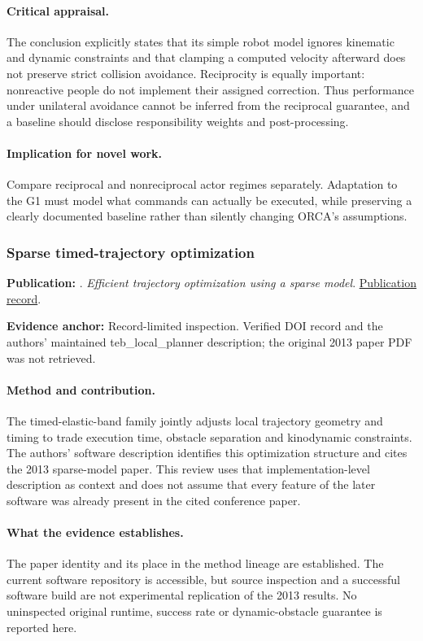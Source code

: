 \paragraph{Critical appraisal.} The conclusion explicitly states that its simple robot model ignores kinematic and dynamic constraints and that clamping a computed velocity afterward does not preserve strict collision avoidance. Reciprocity is equally important: nonreactive people do not implement their assigned correction. Thus performance under unilateral avoidance cannot be inferred from the reciprocal guarantee, and a baseline should disclose responsibility weights and post-processing.

\paragraph{Implication for novel work.} Compare reciprocal and nonreciprocal actor regimes separately. Adaptation to the G1 must model what commands can actually be executed, while preserving a clearly documented baseline rather than silently changing ORCA's assumptions.

\subsubsection{Sparse timed-trajectory optimization}\label{paper:teb}
\textbf{Publication:} \citet{teb}. \emph{Efficient trajectory optimization using a sparse model}. \href{https://doi.org/10.1109/ecmr.2013.6698833}{Publication record}.

\textbf{Evidence anchor:} Record-limited inspection. Verified DOI record and the authors' maintained teb\_local\_planner description; the original 2013 paper PDF was not retrieved.

\paragraph{Method and contribution.} The timed-elastic-band family jointly adjusts local trajectory geometry and timing to trade execution time, obstacle separation and kinodynamic constraints. The authors' software description identifies this optimization structure and cites the 2013 sparse-model paper. This review uses that implementation-level description as context and does not assume that every feature of the later software was already present in the cited conference paper.

\paragraph{What the evidence establishes.} The paper identity and its place in the method lineage are established. The current software repository is accessible, but source inspection and a successful software build are not experimental replication of the 2013 results. No uninspected original runtime, success rate or dynamic-obstacle guarantee is reported here.

